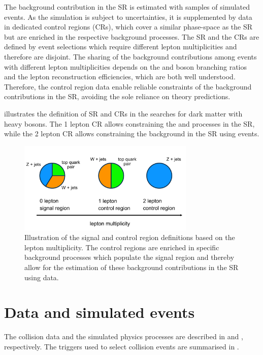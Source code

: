 The background contribution in the SR is estimated with samples of simulated events. As the simulation is subject to uncertainties, it is supplemented by data in dedicated control regions (CRs), which cover a similar phase-space as the SR but are enriched in the respective background processes. The SR and the CRs are defined by event selections which require different lepton multiplicities and therefore are disjoint.
The sharing of the background contributions among events with different lepton multiplicities depends on the \PW and \PZ boson branching ratios and the lepton reconstruction efficiencies, which are both well understood.
Therefore, the control region data enable reliable constraints of the background contributions in the SR, avoiding the sole reliance on theory predictions.

 illustrates the definition of SR and CRs in the searches for dark matter with heavy bosons. The 1 lepton CR allows constraining the \wjets and \ttbar processes in the SR, while the 2 lepton CR allows constraining the \zjets background in the SR using \HepProcess{\PZ \to \Pl \Pl} events.

\begin{figure}[htbp]
    \centering
    \includegraphics[width=0.75\textwidth]{figures/common/common_analysisregions.pdf}
    \caption{Illustration of the signal and control region definitions based on the lepton multiplicity. The control regions are enriched in specific background processes which populate the signal region and thereby allow for the estimation of these background contributions in the SR using data.}
    \label{fig:common:analysis:regions}
\end{figure}


\section{Data and simulated events}
\label{sec:common:data}
The \HepProcess{\Pp\Pp} collision data and the simulated physics processes are described in  and , respectively. The triggers used to select collision events are summarised in .


